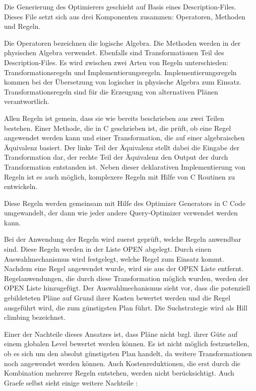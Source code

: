 Die Generierung des Optimierers geschieht auf Basis eines Description-Files. Dieses File setzt sich aus drei Komponenten zusammen: Operatoren, Methoden und Regeln.


Die Operatoren bezeichnen die logische Algebra. Die Methoden werden in der physischen Algebra verwendet. Ebenfalls sind Transformationen Teil des Description-Files. Es wird zwischen zwei Arten von Regeln unterschieden: Transformationsregeln und Implementierungsregeln. Implementierungsregeln kommen bei der Übersetzung von logischer in physische Algebra zum Einsatz. Transformationsregeln sind für die Erzeugung von alternativen Plänen verantwortlich.

Allen Regeln ist gemein, dass sie wie bereits beschrieben aus zwei Teilen bestehen. Einer Methode, die in C geschrieben ist, die prüft, ob eine Regel angewendet werden kann und einer Transformation, die auf einer algebraischen Äquivalenz basiert. Der linke Teil der Äquivalenz stellt dabei die Eingabe der Transformation dar, der rechte Teil der Äquivalenz den Output der durch Transformation entstanden ist. Neben dieser deklarativen Implementierung von Regeln ist es auch möglich, komplexere Regeln mit Hilfe von C Routinen zu entwickeln.

Diese Regeln werden gemeinsam mit Hilfe des Optimizer Generators in C Code umgewandelt, der dann wie jeder andere Query-Optimizer verwendet werden kann. 

Bei der Anwendung der Regeln wird zuerst geprüft, welche Regeln anwendbar sind. Diese Regeln werden in der Liste OPEN abgelegt. Durch einen Auswahlmechanismus wird festgelegt, welche Regel zum Einsatz kommt. Nachdem eine Regel angewendet wurde, wird sie aus der OPEN Liste entfernt. Regelanwendungen, die durch diese Transformation möglich wurden, werden der OPEN Liste hinzugefügt. Der Auswahlmechanismus sieht vor, dass die potenziell gebildeteten Pläne auf Grund ihrer Kosten bewertet werden und die Regel ausgeführt wird, die zum günstigsten Plan führt. Die Suchstrategie wird als Hill climbing bezeichnet.

Einer der Nachteile dieses Ansatzes ist, dass Pläne nicht bzgl. ihrer Güte auf einem globalen Level bewertet werden können. Es ist nicht möglich festzustellen, ob es sich um den absolut günstigsten Plan handelt, da weitere Transformationen noch angewendet werden können. Auch Kostenreduktionen, die erst durch die Kombination mehrerer Regeln entstehen, werden nicht berücksichtigt. Auch Graefe selbst sieht einige weitere Nachteile \cite{graefe1993volcano}:

